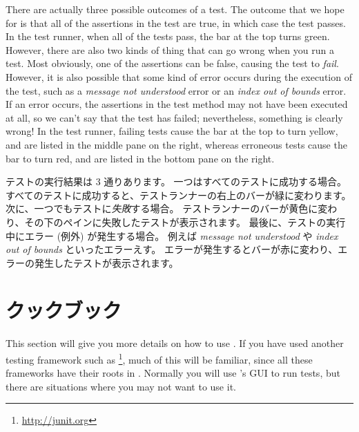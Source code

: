 \documentclass[a4paper,10pt,twoside]{book}
\begin{document}
There are actually three possible outcomes of a test.
The outcome that we hope for is that all of the assertions in the test are true, in which case the test passes.
In the test runner, when all of the tests pass, the bar at the top turns green.
However, there are also two kinds of thing that can go wrong when
you run a test.
Most obviously, one of the assertions can be false, causing the test to \emph{fail}.
However, it is also possible that some kind of error occurs during the execution of the test, such as a \emph{message not understood} error or an \emph{index out of bounds} error.
If an error occurs, the assertions in the test method may not have been executed at all,
so we can't say that the test has failed; nevertheless, something is clearly wrong!
In the {test runner}, failing tests cause the bar at the top to turn yellow, and are listed in the middle pane on the right, whereas erroneous tests cause the bar to turn red, and are listed in the bottom pane on the right.
\fi


テストの実行結果は 3 通りあります。
一つはすべてのテストに成功する場合。
すべてのテストに成功すると、{テストランナー}の右上のバーが緑に変わります。
次に、一つでもテストに\emph{失敗}する場合。
{テストランナー}のバーが黄色に変わり、その下のペインに失敗したテストが表示されます。
最後に、テストの実行中にエラー (例外) が発生する場合。
例えば \emph{message not understood} や \emph{index out of bounds} といったエラーえす。
エラーが発生するとバーが赤に変わり、エラーの発生したテストが表示されます。



\section{\SUnit クックブック}

This section will give you more details on how to use \SUnit.  If you
have used another testing framework such as \JUnit\footnote{\url{http://junit.org}},
much of this will be familiar, since all these frameworks have their roots in \SUnit.
Normally you will use \SUnit's GUI to run tests, but there are
situations where you may not want to use it.
\fi
\end{document}

